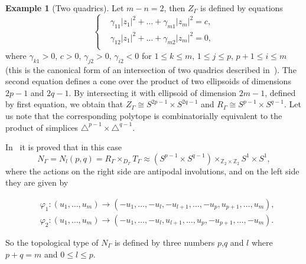 \documentclass[jsg]{IP_v1_forauthors}
\def\leq{\leqslant}
\theoremstyle{definition}
\numberwithin{equation}{section}
\newtheorem{exam}{Example}
\begin{document}
\begin{exam}[Two quadrics]
Let $m-n=2$, then $Z_\Gamma$ is defined by equations
\begin{equation}
\left \{
\begin{aligned}
&\gamma_{11} |z_1|^2 + \ldots + \gamma_{m1} |z_m|^2=c, \\
&\gamma_{12} |z_1|^2 + \ldots + \gamma_{m2} |z_m|^2=0,\\
\end{aligned}
\right.
\end{equation}
where $\gamma_{k1} > 0$, $c > 0$, $\gamma_{j2} > 0$, $\gamma_{i2} < 0$  for $1 \leq k \leq m$, $1 \leq j \leq p$, $p+1 \leq i \leq m$ (this is the canonical form of an intersection of two quadrics described in~\cite[Proposition 4.2]{MP}). The second equation defines a cone over the product of two ellipsoids of dimensions $2p-1$ and $2q-1$. By intersecting it with ellipsoid of dimension $2m-1$, defined by first equation, we obtain that $Z_\Gamma \cong S^{2p-1} \times S^{2q-1}$ and $R_\Gamma \cong S^{p-1}\times S^{q-1}$. Let us note that the corresponding polytope is combinatorially equivalent to the product of simplices $\triangle^{p-1}\times\triangle^{q-1}$.



In~\cite{MP} it is proved that in this case
\begin{equation} 
N_\Gamma = N_l (p,q)= R_\Gamma \times_{D_\Gamma} T_\Gamma \approx (S^{p-1}\times S^{q-1}) \times_{\mathbb{Z}_2\times \mathbb{Z}_2} S^1 \times S^1,
\end{equation}
where the actions on the right side are antipodal involutions, and on the left side they are given by

\begin{equation}
\begin{aligned}
&\varphi_1: (u_1,\dots ,u_m)\rightarrow(-u_1,\dots,-u_l,-u_{l+1},\dots,-u_p,u_{p+1},\dots,u_m),\\
&\varphi_2: (u_1,\dots ,u_m)\rightarrow(-u_1,\dots,-u_l,u_{l+1},\dots,u_p,-u_{p+1},\dots,-u_m).
\end{aligned}
\end{equation}

\noindent So the topological type of $N_\Gamma$ is defined by three numbers $p$,$q$ and $l$ where $p+q=m$ and $0 \leq l \leq p$. 


\end{exam}
\end{document}
